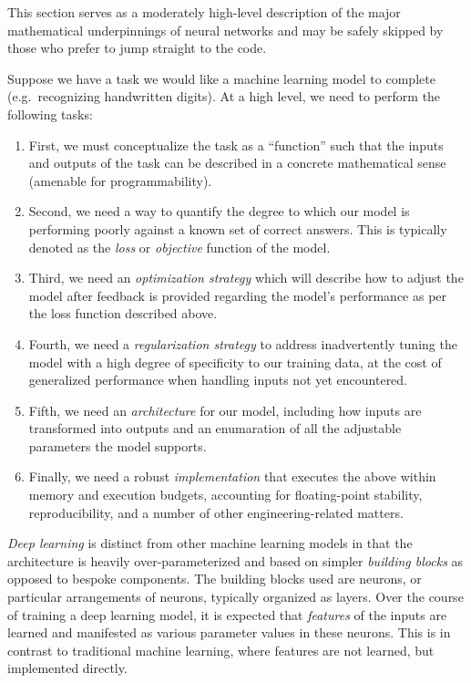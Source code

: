 \documentclass[
]{article}
\providecommand{\tightlist}{%
  \setlength{\itemsep}{0pt}\setlength{\parskip}{0pt}}
\begin{document}
This section serves as a moderately high-level description of the major
mathematical underpinnings of neural networks and may be safely skipped
by those who prefer to jump straight to the code.

Suppose we have a task we would like a machine learning model to
complete (e.g.~recognizing handwritten digits). At a high level, we need
to perform the following tasks:

\begin{enumerate}
\def\labelenumi{\arabic{enumi}.}
\tightlist
\item
  First, we must conceptualize the task as a ``function'' such that the
  inputs and outputs of the task can be described in a concrete
  mathematical sense (amenable for programmability).
\item
  Second, we need a way to quantify the degree to which our model is
  performing poorly against a known set of correct answers. This is
  typically denoted as the \emph{loss} or \emph{objective} function of
  the model.
\item
  Third, we need an \emph{optimization strategy} which will describe how
  to adjust the model after feedback is provided regarding the model's
  performance as per the loss function described above.
\item
  Fourth, we need a \emph{regularization strategy} to address
  inadvertently tuning the model with a high degree of specificity to
  our training data, at the cost of generalized performance when
  handling inputs not yet encountered.
\item
  Fifth, we need an \emph{architecture} for our model, including how
  inputs are transformed into outputs and an enumaration of all the
  adjustable parameters the model supports.
\item
  Finally, we need a robust \emph{implementation} that executes the
  above within memory and execution budgets, accounting for
  floating-point stability, reproducibility, and a number of other
  engineering-related matters.
\end{enumerate}

\emph{Deep learning} is distinct from other machine learning models in
that the architecture is heavily over-parameterized and based on simpler
\emph{building blocks} as opposed to bespoke components. The building
blocks used are neurons, or particular arrangements of neurons,
typically organized as layers. Over the course of training a deep
learning model, it is expected that \emph{features} of the inputs are
learned and manifested as various parameter values in these neurons.
This is in contrast to traditional machine learning, where features are
not learned, but implemented directly.
\end{document}
